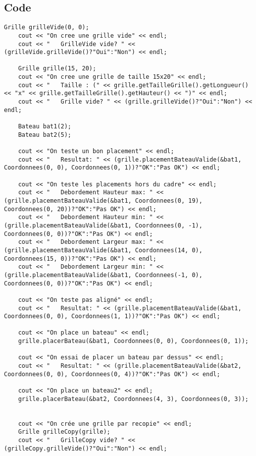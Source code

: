         \subsection{Code}
\begin{lstlisting}
Grille grilleVide(0, 0);
    cout << "On cree une grille vide" << endl;
    cout << "   GrilleVide vide? " << (grilleVide.grilleVide()?"Oui":"Non") << endl;

    Grille grille(15, 20);
    cout << "On cree une grille de taille 15x20" << endl;
    cout << "   Taille : (" << grille.getTailleGrille().getLongueur()  << "x" << grille.getTailleGrille().getHauteur() << ")" << endl;
    cout << "   Grille vide? " << (grille.grilleVide()?"Oui":"Non") << endl;

    Bateau bat1(2);
    Bateau bat2(5);

    cout << "On teste un bon placement" << endl;
    cout << "   Resultat: " << (grille.placementBateauValide(&bat1, Coordonnees(0, 0), Coordonnees(0, 1))?"OK":"Pas OK") << endl;

    cout << "On teste les placements hors du cadre" << endl;
    cout << "   Debordement Hauteur max: " << (grille.placementBateauValide(&bat1, Coordonnees(0, 19), Coordonnees(0, 20))?"OK":"Pas OK") << endl;
    cout << "   Debordement Hauteur min: " << (grille.placementBateauValide(&bat1, Coordonnees(0, -1), Coordonnees(0, 0))?"OK":"Pas OK") << endl;
    cout << "   Debordement Largeur max: " << (grille.placementBateauValide(&bat1, Coordonnees(14, 0), Coordonnees(15, 0))?"OK":"Pas OK") << endl;
    cout << "   Debordement Largeur min: " << (grille.placementBateauValide(&bat1, Coordonnees(-1, 0), Coordonnees(0, 0))?"OK":"Pas OK") << endl;

    cout << "On teste pas aligné" << endl;
    cout << "   Resultat: " << (grille.placementBateauValide(&bat1, Coordonnees(0, 0), Coordonnees(1, 1))?"OK":"Pas OK") << endl;

    cout << "On place un bateau" << endl;
    grille.placerBateau(&bat1, Coordonnees(0, 0), Coordonnees(0, 1));

    cout << "On essai de placer un bateau par dessus" << endl;
    cout << "   Resultat: " << (grille.placementBateauValide(&bat2, Coordonnees(0, 0), Coordonnees(0, 4))?"OK":"Pas OK") << endl;

    cout << "On place un bateau2" << endl;
    grille.placerBateau(&bat2, Coordonnees(4, 3), Coordonnees(0, 3));


    cout << "On crée une grille par recopie" << endl;
    Grille grilleCopy(grille);
    cout << "   GrilleCopy vide? " << (grilleCopy.grilleVide()?"Oui":"Non") << endl;


\end{lstlisting}
